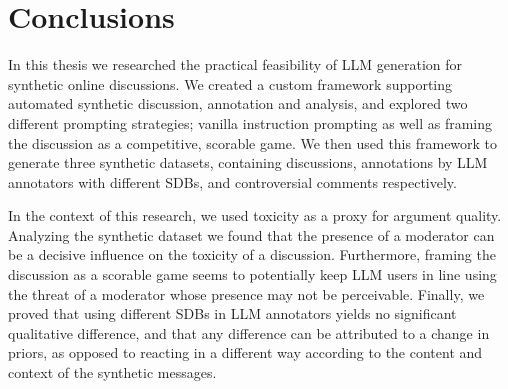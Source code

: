 %
\chapter{Conclusions}
\label{sec:conclusions}

In this thesis we researched the practical feasibility of LLM generation for synthetic online discussions. We created a custom framework supporting automated synthetic discussion, annotation and analysis, and explored two different prompting strategies; vanilla instruction prompting as well as framing the discussion as a competitive, scorable game. We then used this framework to generate three synthetic datasets, containing discussions, annotations by LLM annotators with different SDBs, and controversial comments respectively. 

In the context of this research, we used toxicity as a proxy for argument quality. Analyzing the synthetic dataset we found that the presence of a moderator can be a decisive influence on the toxicity of a discussion. Furthermore, framing the discussion as a scorable game seems to potentially keep LLM users in line using the threat of a moderator whose presence may not be perceivable. Finally, we proved that using different SDBs in LLM annotators yields no significant qualitative difference, and that any difference can be attributed to a change in priors, as opposed to reacting in a different way according to the content and context of the synthetic messages.

